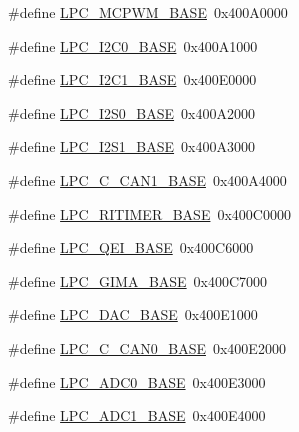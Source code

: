 \begin{DoxyCompactItemize}
\item 
\#define \hyperlink{group___p_e_r_i_p_h__43_x_x___b_a_s_e_gad8a41dc802e3ea0ba9457d42a6927c03}{L\+P\+C\+\_\+\+M\+C\+P\+W\+M\+\_\+\+B\+A\+SE}~0x400\+A0000
\item 
\#define \hyperlink{group___p_e_r_i_p_h__43_x_x___b_a_s_e_gab4476c9e874621194369f74fcf26ce92}{L\+P\+C\+\_\+\+I2\+C0\+\_\+\+B\+A\+SE}~0x400\+A1000
\item 
\#define \hyperlink{group___p_e_r_i_p_h__43_x_x___b_a_s_e_gae59f73cf24ff126be3b9a8b921926676}{L\+P\+C\+\_\+\+I2\+C1\+\_\+\+B\+A\+SE}~0x400\+E0000
\item 
\#define \hyperlink{group___p_e_r_i_p_h__43_x_x___b_a_s_e_gae77fe89f0abd4b4b73de7ab5adc822f5}{L\+P\+C\+\_\+\+I2\+S0\+\_\+\+B\+A\+SE}~0x400\+A2000
\item 
\#define \hyperlink{group___p_e_r_i_p_h__43_x_x___b_a_s_e_gad2702d06c20bbf06f072e29ec173e4ab}{L\+P\+C\+\_\+\+I2\+S1\+\_\+\+B\+A\+SE}~0x400\+A3000
\item 
\#define \hyperlink{group___p_e_r_i_p_h__43_x_x___b_a_s_e_ga4715c87f8d58d962b5fa3d4e23e06328}{L\+P\+C\+\_\+\+C\+\_\+\+C\+A\+N1\+\_\+\+B\+A\+SE}~0x400\+A4000
\item 
\#define \hyperlink{group___p_e_r_i_p_h__43_x_x___b_a_s_e_ga37e5300b78c57ef9d338291e79610971}{L\+P\+C\+\_\+\+R\+I\+T\+I\+M\+E\+R\+\_\+\+B\+A\+SE}~0x400\+C0000
\item 
\#define \hyperlink{group___p_e_r_i_p_h__43_x_x___b_a_s_e_ga80fa25b18324c10c8e5c26893e6f0a67}{L\+P\+C\+\_\+\+Q\+E\+I\+\_\+\+B\+A\+SE}~0x400\+C6000
\item 
\#define \hyperlink{group___p_e_r_i_p_h__43_x_x___b_a_s_e_ga487598b990a1a910e078773fb461a9f9}{L\+P\+C\+\_\+\+G\+I\+M\+A\+\_\+\+B\+A\+SE}~0x400\+C7000
\item 
\#define \hyperlink{group___p_e_r_i_p_h__43_x_x___b_a_s_e_ga3bbaedad584252212d4704bb419489f6}{L\+P\+C\+\_\+\+D\+A\+C\+\_\+\+B\+A\+SE}~0x400\+E1000
\item 
\#define \hyperlink{group___p_e_r_i_p_h__43_x_x___b_a_s_e_gad8ad25cb93a229d94ba1de367cbb1fa3}{L\+P\+C\+\_\+\+C\+\_\+\+C\+A\+N0\+\_\+\+B\+A\+SE}~0x400\+E2000
\item 
\#define \hyperlink{group___p_e_r_i_p_h__43_x_x___b_a_s_e_gaeab1b71ab377bf49f50db80ea0c618a8}{L\+P\+C\+\_\+\+A\+D\+C0\+\_\+\+B\+A\+SE}~0x400\+E3000
\item 
\#define \hyperlink{group___p_e_r_i_p_h__43_x_x___b_a_s_e_ga87b2b5b070b1fa91cf2f2bf243420e7d}{L\+P\+C\+\_\+\+A\+D\+C1\+\_\+\+B\+A\+SE}~0x400\+E4000
\item 

\end{DoxyCompactItemize}

